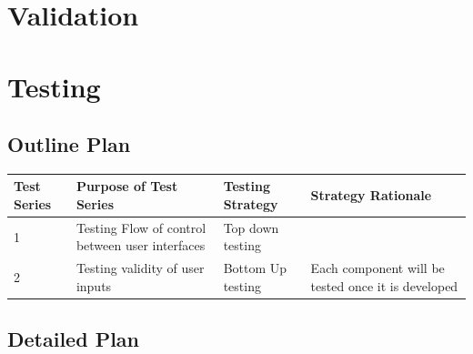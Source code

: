 \section{Validation}

\section{Testing}

\begin{landscape}
\subsection{Outline Plan}

\begin{center}
    \begin{tabular}{|p{2cm}|p{5cm}|p{5cm}|p{4cm}|}
        \hline
        \textbf{Test Series} & \textbf{Purpose of Test Series} & \textbf{Testing Strategy} & \textbf{Strategy Rationale}\\ \hline
        1 & Testing  Flow of control between user interfaces & Top down testing & \\ \hline
        2 & Testing validity of user inputs & Bottom Up testing & Each component will be tested once it is developed \\ \hline
    \end{tabular}
\end{center}

\subsection{Detailed Plan}


\end{landscape}
